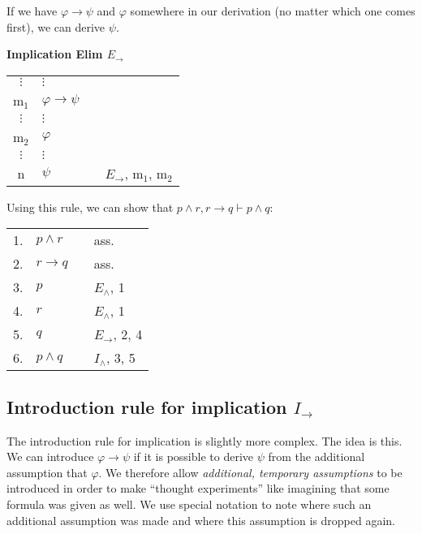 \documentclass[nobib,nofonts]{tufte-handout}
\begin{document}
If we have $\varphi \rightarrow \psi$ and $\varphi$ somewhere in our derivation (no matter which one comes first), we can derive $\psi$.

\bigskip
\noindent \colorbox{mygray!60}{\centering
  \begin{minipage}[t]{0.35\linewidth}
    \textbf{Implication Elim $E_{\rightarrow}$}
  \end{minipage}
  \begin{minipage}[t]{0.55\linewidth}
    \begin{tabular}{clcl}
      $\vdots$ & $\vdots$                   & \\
      m$_{1}$  & $\varphi \rightarrow \psi$ &  \\
      $\vdots$ & $\vdots$                   & \\
      m$_{2}$  & $\varphi$                  &  \\
      $\vdots$ & $\vdots$                   & \\
      n        & $\psi$                     & & $E_{\rightarrow}$, m$_{1}$, m$_{2}$
    \end{tabular}
  \end{minipage}
}
\bigskip

Using this rule, we can show that $p \wedge r, r \rightarrow q \vdash p \wedge q$:

\begin{tabular}{clcl}
  1. & $p \wedge r$      & & ass. \\
  2. & $r \rightarrow q$ & & ass.  \\
  3. & $p$               & & $E_{\wedge}$, 1  \\
  4. & $r$               & & $E_{\wedge}$, 1  \\
  5. & $q$               & & $E_{\rightarrow}$, 2, 4 \\
  6. & $p \wedge q$      & & $I_{\wedge}$, 3, 5
\end{tabular}

\subsection{Introduction rule for implication $I_{\rightarrow}$}

The introduction rule for implication is slightly more complex.
The idea is this.
We can introduce $\varphi \rightarrow \psi$ if it is possible to derive $\psi$ from the additional assumption that $\varphi$.
We therefore allow \emph{additional, temporary assumptions} to be introduced in order to make ``thought experiments'' like imagining that some formula was given as well.
We use special notation to note where such an additional assumption was made and where this assumption is dropped again.
\end{document}
